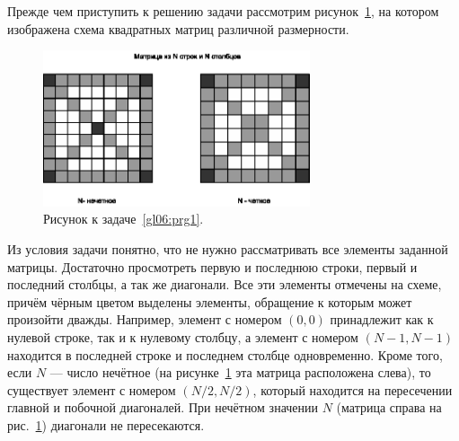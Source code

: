 

Прежде чем приступить к решению задачи рассмотрим рисунок~\ref{ch06:refDrawing8}, на котором изображена схема квадратных
матриц различной размерности. 

\begin{figure}[htb]
\begin{center}
\includegraphics[width=0.7\textwidth]{img/ris_6_9}
\caption{Рисунок к задаче~\ref{gl06:prg1}.}
\label{ch06:refDrawing8}
\end{center}
\end{figure}

Из условия задачи понятно, что не нужно рассматривать все элементы заданной матрицы. Достаточно просмотреть первую и
последнюю строки, первый и последний столбцы, а так же диагонали. Все эти элементы отмечены на схеме, причём чёрным
цветом выделены элементы, обращение к которым может произойти дважды. Например, элемент с номером $(0,0)$ принадлежит как
к нулевой строке, так и к нулевому столбцу, а элемент с номером $(N-1,N-1)$
находится в последней строке и последнем столбце одновременно. Кроме того, если $N$ --- число нечётное 
(на рисунке~\ref{ch06:refDrawing8} эта матрица расположена слева), то существует элемент с номером $(N/2, N/2)$,
который находится на пересечении главной и побочной диагоналей. При нечётном значении $N$ (матрица справа на
рис.~\ref{ch06:refDrawing8}) диагонали не пересекаются.

